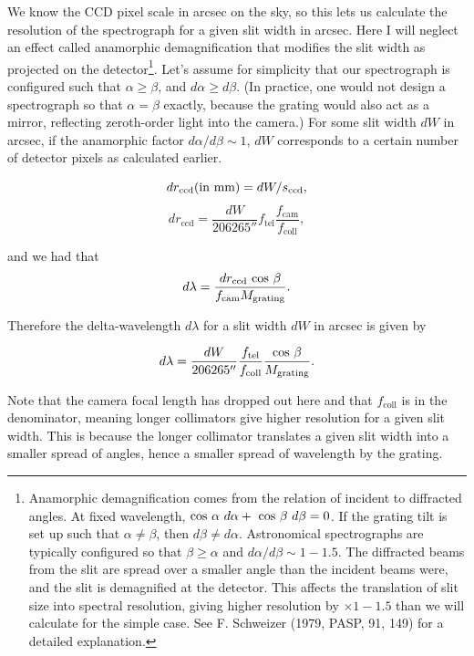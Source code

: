 \documentclass[12pt]{article}
\newcommand{\subscript}[1]{\mathrm{#1}}
\newcommand{\tel}{\subscript{tel}}
\newcommand{\coll}{\subscript{coll}}
\newcommand{\ccd}{\subscript{ccd}}
\newcommand{\cam}{\subscript{cam}}
\newcommand{\grating}{\subscript{grating}}
\begin{document}
We know the CCD pixel scale in arcsec on the sky, so this lets
us calculate the resolution of the spectrograph for a given
slit width in arcsec.  Here I will neglect an effect called 
anamorphic demagnification that modifies the slit width as
projected on the detector\footnote{
Anamorphic demagnification
comes from the relation of incident to diffracted angles.
At fixed wavelength, 
${\rm cos}~\alpha~d\alpha +\ {\rm cos}~\beta~d\beta =0$.
If the grating tilt is set up such that $\alpha \neq \beta$,
then $d\beta \neq d\alpha$.  Astronomical spectrographs
are typically configured so that $\beta \geq \alpha$ and
$d\alpha/d\beta \sim 1-1.5$.  The diffracted beams from the 
slit are spread over a smaller angle than the incident beams were, and the
slit is demagnified at the detector.  This affects the translation 
of slit size into spectral resolution, giving higher resolution 
by $\times 1-1.5$ than we will calculate for the simple case.  See
F. Schweizer (1979, PASP, 91, 149) for a detailed explanation.}.
Let's assume for simplicity
that our spectrograph is configured such that $\alpha \geq \beta$,
and $d\alpha \geq d\beta$.  (In practice, one would not design
a spectrograph so that $\alpha=\beta$ exactly, because the grating would
also act as a mirror, reflecting zeroth-order light into the camera.)
For some slit width $dW$ in arcsec, if the anamorphic factor 
$d\alpha/d\beta \sim 1$, $dW$ corresponds to a certain number 
of detector pixels as calculated earlier.

$$ dr_{\ccd} {\rm (in\ mm)} = dW / s_{\ccd} , $$
$$ dr_{\ccd} = \frac{dW}{206265''} f_{\tel} \frac{f_{\cam}}{f_{\coll}}, $$

and we had that
$$ d\lambda = \frac{dr_{\ccd}~{\rm cos}~\beta}{f_{\cam} M_{\grating}}. $$

Therefore the delta-wavelength $d\lambda$ for a slit width $dW$
in arcsec is given by

%

$$  d\lambda = \frac{dW}{206265''} \frac{f_{\tel}}{f_{\coll}}\frac{{\rm cos}~\beta}{M_{\grating}}. $$

Note that the camera focal length has dropped out here and
that $f_{\coll}$ is in the denominator, meaning longer collimators
give higher resolution for a given slit width.  This is 
because the longer collimator translates a given slit width
into a smaller spread of angles, hence a smaller spread of
wavelength by the grating.
\end{document}
